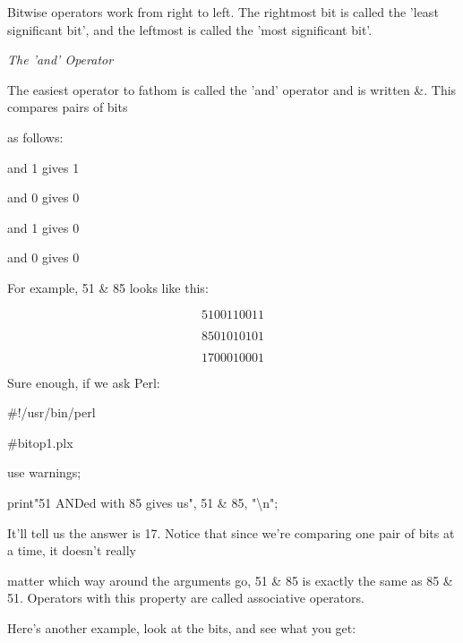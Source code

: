 \documentclass[a4paper,11pt]{book}
\begin{document}
\noindent 

\noindent Bitwise operators work from right to left. The rightmost bit is called the 'least significant bit', and the leftmost is called the 'most significant bit'.

\noindent 

\noindent \textit{The 'and' Operator}

\noindent The easiest operator to fathom is called the 'and' operator and is written \&. This compares pairs of bits

\noindent as follows:

\noindent 

 and 1 gives 1

\noindent 

 and 0 gives 0

\noindent 

 and 1 gives 0

\noindent 

 and 0 gives 0

\noindent 

\noindent 

\noindent For example, 51 \& 85 looks like this:

\noindent 

\[51 00110011\] 

\[85 01010101\] 

\[17 00010001\] 


\noindent Sure enough, if we ask Perl:

\noindent 

\noindent \#!/usr/bin/perl

\noindent \#bitop1.plx

\noindent use warnings;

\noindent print"51 ANDed with 85 gives us", 51 \& 85, "\textbackslash n";

\noindent 

\noindent 

\noindent It'll tell us the answer is 17. Notice that since we're comparing one pair of bits at a time, it doesn't really

\noindent matter which way around the arguments go, 51 \& 85 is exactly the same as 85 \& 51. Operators with this property are called associative operators.

\noindent 

\noindent Here's another example, look at the bits, and see what you get:

\noindent 
\end{document}
